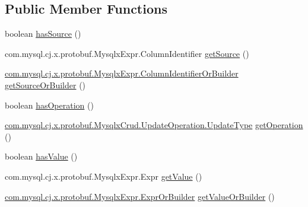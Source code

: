 \subsection*{Public Member Functions}
\begin{DoxyCompactItemize}
\item 
boolean \mbox{\hyperlink{interfacecom_1_1mysql_1_1cj_1_1x_1_1protobuf_1_1_mysqlx_crud_1_1_update_operation_or_builder_a138b6956535025ced3fbdb85f14c864a}{has\+Source}} ()
\item 
com.\+mysql.\+cj.\+x.\+protobuf.\+Mysqlx\+Expr.\+Column\+Identifier \mbox{\hyperlink{interfacecom_1_1mysql_1_1cj_1_1x_1_1protobuf_1_1_mysqlx_crud_1_1_update_operation_or_builder_ae57e5ccaa6dfe837679a90fda396cc52}{get\+Source}} ()
\item 
\mbox{\hyperlink{interfacecom_1_1mysql_1_1cj_1_1x_1_1protobuf_1_1_mysqlx_expr_1_1_column_identifier_or_builder}{com.\+mysql.\+cj.\+x.\+protobuf.\+Mysqlx\+Expr.\+Column\+Identifier\+Or\+Builder}} \mbox{\hyperlink{interfacecom_1_1mysql_1_1cj_1_1x_1_1protobuf_1_1_mysqlx_crud_1_1_update_operation_or_builder_a164bc04a1b5b8d2aa992b4c9e213357c}{get\+Source\+Or\+Builder}} ()
\item 
boolean \mbox{\hyperlink{interfacecom_1_1mysql_1_1cj_1_1x_1_1protobuf_1_1_mysqlx_crud_1_1_update_operation_or_builder_a72046f6c7afa69858f23092e94e2f2e5}{has\+Operation}} ()
\item 
\mbox{\hyperlink{enumcom_1_1mysql_1_1cj_1_1x_1_1protobuf_1_1_mysqlx_crud_1_1_update_operation_1_1_update_type}{com.\+mysql.\+cj.\+x.\+protobuf.\+Mysqlx\+Crud.\+Update\+Operation.\+Update\+Type}} \mbox{\hyperlink{interfacecom_1_1mysql_1_1cj_1_1x_1_1protobuf_1_1_mysqlx_crud_1_1_update_operation_or_builder_a68d51058c03785474068941d2a6484cc}{get\+Operation}} ()
\item 
boolean \mbox{\hyperlink{interfacecom_1_1mysql_1_1cj_1_1x_1_1protobuf_1_1_mysqlx_crud_1_1_update_operation_or_builder_ae0e8a7587819519f378282cc6f08a541}{has\+Value}} ()
\item 
com.\+mysql.\+cj.\+x.\+protobuf.\+Mysqlx\+Expr.\+Expr \mbox{\hyperlink{interfacecom_1_1mysql_1_1cj_1_1x_1_1protobuf_1_1_mysqlx_crud_1_1_update_operation_or_builder_a5700035d72e819b7f409cd767fa39de6}{get\+Value}} ()
\item 
\mbox{\hyperlink{interfacecom_1_1mysql_1_1cj_1_1x_1_1protobuf_1_1_mysqlx_expr_1_1_expr_or_builder}{com.\+mysql.\+cj.\+x.\+protobuf.\+Mysqlx\+Expr.\+Expr\+Or\+Builder}} \mbox{\hyperlink{interfacecom_1_1mysql_1_1cj_1_1x_1_1protobuf_1_1_mysqlx_crud_1_1_update_operation_or_builder_a0583f94f614e2d2f7d37dd0269196095}{get\+Value\+Or\+Builder}} ()
\end{DoxyCompactItemize}


